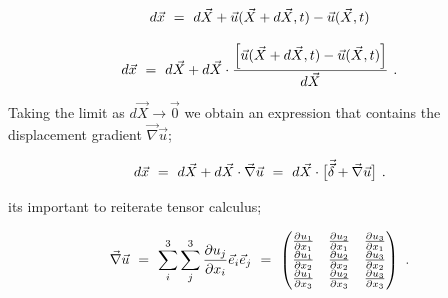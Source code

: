 \documentclass{article}
\begin{document}
\begin{equation} \label{eq:1}
d \vec{x} \hspace{0.125cm} = \hspace{0.125cm} d \vec{X} +  \vec{u}( \vec{X} + d \vec{X} , t ) -  \vec{u}( \vec{X} , t ) 
\end{equation} 

\begin{equation} \label{eq:1}
d \vec{x} \hspace{0.125cm} = \hspace{0.125cm} d \vec{X} + d \vec{X} \cdot \frac{\Big[ \vec{u}( \vec{X} + d \vec{X} , t ) -  \vec{u}( \vec{X} , t ) \Big]}{d \vec{X}} \hspace{0.125cm} .
\end{equation} 

Taking the limit as \begin{math} d \vec{X} \rightarrow \vec{0} \end{math} we obtain an expression that contains the displacement gradient \begin{math} \vec{\nabla} \vec{u} \end{math};

\begin{equation} \label{eq:1}
d \vec{x} \hspace{0.125cm} = \hspace{0.125cm} d \vec{X} + d \vec{X} \cdot \vec{\nabla} \vec{u}  \hspace{0.125cm} = \hspace{0.125cm} d \vec{X} \cdot \big[ \vec{\vec{\delta}} + \vec{\nabla} \vec{u} \big] \hspace{0.125cm} .
\end{equation} 

its important to reiterate tensor calculus;

\begin{equation} \label{eq:1}
\vec{\nabla} \vec{u} \hspace{0.125cm} = \hspace{0.125cm} \sum_{i}^{3} \sum_{j}^{3} \frac{\partial{u_j}}{\partial{x_i}} \vec{e}_i \vec{e}_j  \hspace{0.125cm} =  \hspace{0.125cm}  \begin{pmatrix} \frac{\partial{u_1}}{\partial{x_1}} & \frac{\partial{u_2}}{\partial{x_1}} & \frac{\partial{u_3}}{\partial{x_1}} \\ \frac{\partial{u_1}}{\partial{x_2}} & \frac{\partial{u_2}}{\partial{x_2}} & \frac{\partial{u_3}}{\partial{x_2}} \\ \frac{\partial{u_1}}{\partial{x_3}} & \frac{\partial{u_2}}{\partial{x_3}} & \frac{\partial{u_3}}{\partial{x_3}} \end{pmatrix}  \hspace{0.125cm} .
\end{equation} 
\end{document}
